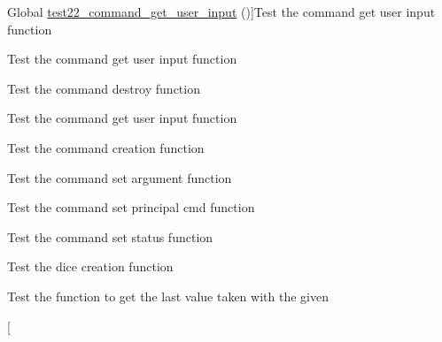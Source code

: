 \begin{DoxyRefList}
Global \hyperlink{command__test_8c_ac1ff85e1d54f46eccdbdaffec062d5c0}{test22\+\_\+command\+\_\+get\+\_\+user\+\_\+input} ()]Test the command get user input function  
\item[\label{test__test000047}%
\Hypertarget{test__test000047}%
Global \hyperlink{command__test_8c_a618f500cde2987b4f746357b2a990b69}{test23\+\_\+command\+\_\+get\+\_\+user\+\_\+input} ()]Test the command get user input function  
\item[\label{test__test000024}%
\Hypertarget{test__test000024}%
Global \hyperlink{command__test_8c_ad445f3e81035d4ab32ebc1526eb83fcb}{test2\+\_\+command\+\_\+destroy} ()]Test the command destroy function  
\item[\label{test__test000026}%
\Hypertarget{test__test000026}%
Global \hyperlink{command__test_8c_a3ba7658db8aa069706b344d42ceabfaa}{test2\+\_\+command\+\_\+get\+\_\+user\+\_\+input} ()]Test the command get user input function  
\item[\label{test__test000002}%
\Hypertarget{test__test000002}%
Global \hyperlink{command__test_8c_a084363877b09c47c4167fb675ba0a6c5}{test2\+\_\+command\+\_\+init} ()]Test the command creation function  
\item[\label{test__test000021}%
\Hypertarget{test__test000021}%
Global \hyperlink{command__test_8c_a66f78c148ff91ffcbaa521f00d208a75}{test2\+\_\+command\+\_\+set\+\_\+argument} ()]Test the command set argument function  
\item[\label{test__test000006}%
\Hypertarget{test__test000006}%
Global \hyperlink{command__test_8c_a2f897a338775789b9e1b0b8a8647fd85}{test2\+\_\+command\+\_\+set\+\_\+principal\+\_\+cmd} ()]Test the command set principal cmd function  
\item[\label{test__test000018}%
\Hypertarget{test__test000018}%
Global \hyperlink{command__test_8c_a67ea36686a450269ef95eace71e78867}{test2\+\_\+command\+\_\+set\+\_\+status} ()]Test the command set status function  
\item[\label{test__test000049}%
\Hypertarget{test__test000049}%
Global \hyperlink{dice__test_8c_a3eacb7c8e4140ce2083d9705937f5106}{test2\+\_\+dice\+\_\+create} ()]Test the dice creation function  
\item[\label{test__test000054}%
\Hypertarget{test__test000054}%
Global \hyperlink{dice__test_8c_a5f15e643f69bfe582f6ffd548b92f846}{test2\+\_\+dice\+\_\+get\+\_\+last} ()]Test the function to get the last value taken with the given  
\item[\label{test__test000051}%
%

\end{DoxyRefList}
